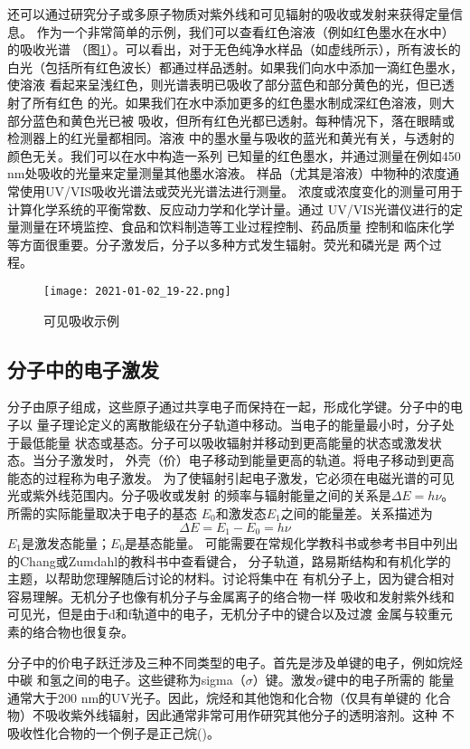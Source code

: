 还可以通过研究分子或多原子物质对紫外线和可见辐射的吸收或发射来获得定量信息。
作为一个非常简单的示例，我们可以查看红色溶液（例如红色墨水在水中）的吸收光谱
（图\ref{fig:5.2}）。可以看出，对于无色纯净水样品（如虚线所示），所有波长的
白光（包括所有红色波长）都通过样品透射。如果我们向水中添加一滴红色墨水，使溶液
看起来呈浅红色，则光谱表明已吸收了部分蓝色和部分黄色的光，但已透射了所有红色
的光。如果我们在水中添加更多的红色墨水制成深红色溶液，则大部分蓝色和黄色光已被
吸收，但所有红色光都已透射。每种情况下，落在眼睛或检测器上的红光量都相同。溶液
中的墨水量与吸收的蓝光和黄光有关，与透射的颜色无关。我们可以在水中构造一系列
已知量的红色墨水，并通过测量在例如450 nm处吸收的光量来定量测量其他墨水溶液。
样品（尤其是溶液）中物种的浓度通常使用UV/VIS吸收光谱法或荧光光谱法进行测量。
浓度或浓度变化的测量可用于计算化学系统的平衡常数、反应动力学和化学计量。通过
UV/VIS光谱仪进行的定量测量在环境监控、食品和饮料制造等工业过程控制、药品质量
控制和临床化学等方面很重要。分子激发后，分子以多种方式发生辐射。荧光和磷光是
两个过程。
\begin{figure}[htpb]
    \centering
    \texttt{[image: 2021-01-02\_19-22.png]}
    \caption{可见吸收示例}
    \label{fig:5.2}
\end{figure}
\subsection{分子中的电子激发}
分子由原子组成，这些原子通过共享电子而保持在一起，形成化学键。分子中的电子以
量子理论定义的离散能级在分子轨道中移动。当电子的能量最小时，分子处于最低能量
状态或基态。分子可以吸收辐射并移动到更高能量的状态或激发状态。当分子激发时，
外壳（价）电子移动到能量更高的轨道。将电子移动到更高能态的过程称为电子激发。
为了使辐射引起电子激发，它必须在电磁光谱的可见光或紫外线范围内。分子吸收或发射
的频率与辐射能量之间的关系是$\Delta E = h\nu$。所需的实际能量取决于电子的基态
$E_0$和激发态$E_1$之间的能量差。关系描述为
\begin{equation}
    \Delta E = E_1 - E_0 = h\nu
    \label{5.1}
\end{equation}
$E_1$是激发态能量；$E_0$是基态能量。
可能需要在常规化学教科书或参考书目中列出的Chang或Zumdahl的教科书中查看键合，
分子轨道，路易斯结构和有机化学的主题，以帮助您理解随后讨论的材料。讨论将集中在
有机分子上，因为键合相对容易理解。无机分子也像有机分子与金属离子的络合物一样
吸收和发射紫外线和可见光，但是由于d和f轨道中的电子，无机分子中的键合以及过渡
金属与较重元素的络合物也很复杂。

分子中的价电子跃迁涉及三种不同类型的电子。首先是涉及单键的电子，例如烷烃中碳
和氢之间的电子。这些键称为sigma（$\sigma$）键。激发$\sigma$键中的电子所需的
能量通常大于200 nm的UV光子。因此，烷烃和其他饱和化合物（仅具有单键的
化合物）不吸收紫外线辐射，因此通常非常可用作研究其他分子的透明溶剂。这种
不吸收性化合物的一个例子是正己烷()。

